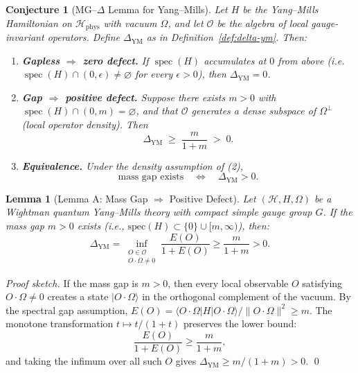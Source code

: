 \documentclass[11pt]{article}
\newtheorem{lemma}[theorem]{Lemma}
\newtheorem{conjecture}[theorem]{Conjecture}
\DeclareMathOperator{\spec}{spec}
\begin{document}
\begin{conjecture}[MG--$\Delta$ Lemma for Yang--Mills]
\label{conj:mg-delta}
Let $H$ be the Yang--Mills Hamiltonian on
$\mathcal{H}_{\mathrm{phys}}$ with vacuum $\Omega$, and let
$\mathcal{O}$ be the algebra of local gauge-invariant operators.
Define $\Delta_{\mathrm{YM}}$ as in
Definition~\ref{def:delta-ym}.  Then:
\begin{enumerate}
\item[\textup{(1)}] \textbf{Gapless $\Rightarrow$ zero defect.}\;
      If\/ $\spec(H)$ accumulates at $0$ from above
      (i.e.\ $\spec(H) \cap (0,\epsilon) \neq \varnothing$ for every
      $\epsilon > 0$), then $\Delta_{\mathrm{YM}} = 0$.
\item[\textup{(2)}] \textbf{Gap $\Rightarrow$ positive defect.}\;
      Suppose there exists $m > 0$ with
      $\spec(H) \cap (0,m) = \varnothing$, and that $\mathcal{O}$
      generates a dense subspace of\/ $\Omega^{\perp}$
      (local operator density).  Then
      \[
        \Delta_{\mathrm{YM}}
        \;\geq\;
        \frac{m}{1+m}
        \;>\; 0 .
      \]
\item[\textup{(3)}] \textbf{Equivalence.}\;
      Under the density assumption of\/ \textup{(2)},
      \[
        \text{mass gap exists}
        \quad\Longleftrightarrow\quad
        \Delta_{\mathrm{YM}} > 0 .
      \]
\end{enumerate}
\end{conjecture}

\begin{lemma}[Lemma A: Mass Gap $\Rightarrow$ Positive Defect]
\label{lem:ym-A}
Let $(\mathcal{H}, H, \Omega)$ be a Wightman quantum Yang--Mills theory with compact simple gauge group $G$. If the mass gap $m > 0$ exists (i.e., $\mathrm{spec}(H) \subset \{0\} \cup [m, \infty)$), then:
\[
  \Delta_{\mathrm{YM}} = \inf_{\substack{O \in \mathcal{O} \\ O \cdot \Omega \neq 0}} \frac{E(O)}{1 + E(O)} \geq \frac{m}{1 + m} > 0.
\]
\end{lemma}

\begin{proof}[Proof sketch]
If the mass gap is $m > 0$, then every local observable $O$ satisfying $O \cdot \Omega \neq 0$ creates a state $|O \cdot \Omega\rangle$ in the orthogonal complement of the vacuum. By the spectral gap assumption, $E(O) = \langle O \cdot \Omega | H | O \cdot \Omega \rangle / \|O \cdot \Omega\|^2 \geq m$. The monotone transformation $t \mapsto t/(1+t)$ preserves the lower bound:
\[
  \frac{E(O)}{1 + E(O)} \geq \frac{m}{1 + m},
\]
and taking the infimum over all such $O$ gives $\Delta_{\mathrm{YM}} \geq m/(1+m) > 0$. \qed
\end{proof}
\end{document}
